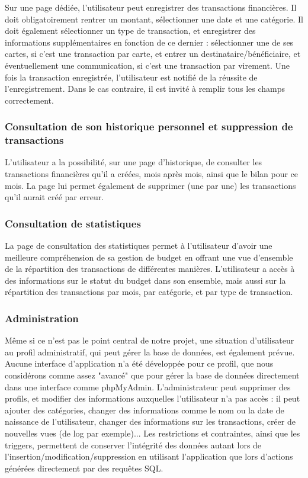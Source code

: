 \documentclass[a4paper,12pt]{article}
\begin{document}
Sur une page dédiée, l'utilisateur peut enregistrer des transactions financières.
Il doit obligatoirement rentrer un montant, sélectionner une date et une catégorie.
Il doit également sélectionner un type de transaction, et enregistrer des informations supplémentaires en fonction de ce dernier : sélectionner une de ses cartes, si c'est une transaction par carte, et entrer un destinataire/bénéficiaire,  et éventuellement une communication, si c'est une transaction par virement.
Une fois la transaction enregistrée, l'utilisateur est notifié de la réussite de l'enregistrement. 
Dans le cas contraire, il est invité à remplir tous les champs correctement.

\subsubsection{Consultation de son historique personnel et suppression de transactions}

L'utilisateur a la possibilité, sur une page d'historique, de consulter les transactions financières qu'il a créées, mois après mois, ainsi que le bilan pour ce mois.
La page lui permet également de supprimer (une par une) les transactions qu'il aurait créé par erreur.

\subsubsection{Consultation de statistiques}

La page de consultation des statistiques permet à l'utilisateur d'avoir une meilleure compréhension de sa gestion de budget en offrant une vue d'ensemble de la répartition des transactions de différentes manières.
L'utilisateur a accès à des informations sur le statut du budget dans son ensemble, mais aussi sur la répartition des transactions par mois, par catégorie, et par type de transaction.

\subsubsection{Administration}

Même si ce n'est pas le point central de notre projet, une situation d'utilisateur au profil administratif, qui peut gérer la base de données, est également prévue.
Aucune interface d'application n'a été développée pour ce profil, que nous considérons comme assez "avancé" que pour gérer la base de données directement dans une interface comme phpMyAdmin.
L'administrateur peut supprimer des profils, et modifier des informations auxquelles l'utilisateur n'a pas accès : il peut ajouter des catégories, changer des informations comme le nom ou la date de naissance de l'utilisateur, changer des informations sur les transactions, créer de nouvelles vues (de log par exemple)... Les restrictions et contraintes, ainsi que les triggers, permettent de conserver l'intégrité des données autant lors de l'insertion/modification/suppression en utilisant l'application que lors d'actions générées directement par des requêtes SQL.
\end{document}
